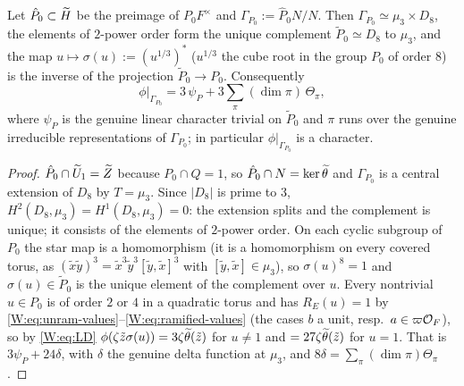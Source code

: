 \begin{lemma}\label{W:lem:2groups}
Let $\hat P_0\subset\widetilde H$ be the preimage of $P_0F^\times$ and
$\Gamma_{P_0}:=\hat P_0N/N$.  Then $\Gamma_{P_0}\simeq\mu_3\times D_8$,
the elements of $2$-power order form the unique complement
$\tilde P_0\simeq D_8$ to $\mu_3$, and the map
$u\mapsto\sigma(u):=(u^{1/3})^*$ ($u^{1/3}$ the cube root in the
group $P_0$ of order $8$) is the inverse of the projection
$\tilde P_0\to P_0$.  Consequently
\begin{equation}\label{W:eq:phiP0}
 \phi|_{\Gamma_{P_0}}=3\,\psi_{P}+3\sum_{\pi}(\dim\pi)\,\Theta_\pi ,
\end{equation}
where $\psi_P$ is the genuine linear character trivial on $\tilde P_0$ and
$\pi$ runs over the genuine irreducible representations of $\Gamma_{P_0}$;
in particular $\phi|_{\Gamma_{P_0}}$ is a character.
\end{lemma}
\begin{proof}
$\hat P_0\cap\widetilde U_1=\widetilde Z$ because $P_0\cap Q=1$, so $\hat P_0\cap N=\ker\widetilde\theta$
and $\Gamma_{P_0}$ is a central extension of $D_8$ by $T=\mu_3$.
Since $|D_8|$ is prime to $3$, $H^2(D_8,\mu_3)=H^1(D_8,\mu_3)=0$: the
extension splits and the complement is unique; it consists of the
elements of $2$-power order.  On each cyclic subgroup of $P_0$ the star
map is a homomorphism (it is a homomorphism on every covered torus, as
$(\tilde x\tilde y)^3=\tilde x^3\tilde y^3[\tilde y,\tilde x]^3$ with
$[\tilde y,\tilde x]\in\mu_3$), so $\sigma(u)^8=1$ and $\sigma(u)\in\tilde P_0$
is the unique element of the complement over $u$.  Every nontrivial
$u\in P_0$ is of order $2$ or $4$ in a quadratic torus and has
$R_E(u)=1$ by \eqref{W:eq:unram-values}--\eqref{W:eq:ramified-values}
(the cases $b$ a unit, resp.\ $a\in\varpi\mathcal O_F$), so by \eqref{W:eq:LD}
$\phi(\zeta\tilde z\sigma(u))=3\zeta\widetilde\theta(\tilde z)$ for $u\ne1$ and
$=27\zeta\widetilde\theta(\tilde z)$ for $u=1$.  That is $3\psi_P+24\delta$, with
$\delta$ the genuine delta function at $\mu_3$, and
$8\delta=\sum_\pi(\dim\pi)\Theta_\pi$.
\end{proof}

